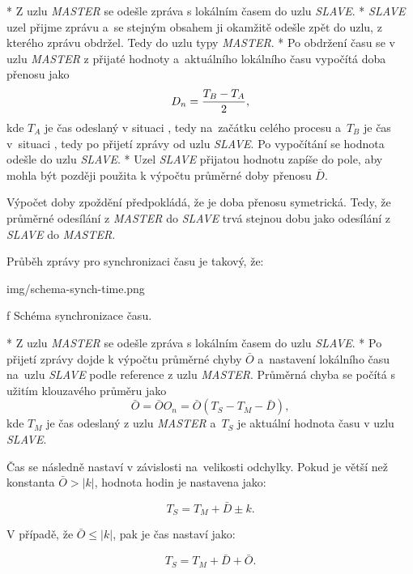 \begitems
* {\sbf [A]} Z uzlu {\em MASTER} se odešle zpráva s lokálním časem do uzlu {\em SLAVE}.
* {\sbf [B]} {\em SLAVE} uzel přijme zprávu a~se stejným obsahem ji okamžitě odešle zpět do uzlu, z kterého zprávu obdržel. Tedy do uzlu typy {\em MASTER}.
* {\sbf [C]} Po obdržení času se v uzlu {\em MASTER} z přijaté hodnoty a~aktuálního lokálního času vypočítá doba přenosu jako
$$
D_n = {{T_B - T_A}\over{2}},
$$
kde $T_A$ je čas odeslaný v situaci {\sbf [A]}, tedy na~začátku celého procesu a~$T_B$ je čas v~situaci {\sbf [C]}, tedy po přijetí zprávy od uzlu {\em SLAVE}. Po vypočítání se hodnota odešle do uzlu {\em SLAVE}.
* {\sbf [D]} Uzel {\em SLAVE} přijatou hodnotu zapíše do pole, aby mohla být později použita k výpočtu průměrné doby přenosu $\bar{D}$.
\enditems

Výpočet doby zpoždění předpokládá, že je doba přenosu symetrická. Tedy, že průměrné odesílání z {\em MASTER} do {\em SLAVE} trvá stejnou dobu jako odesílání z {\em SLAVE} do {\em MASTER}.

Průběh zprávy pro synchronizaci {\sbf času} je takový, že:

\medskip
{}
\picw=16cm \cinspic img/schema-synch-time.png
\caption/f Schéma synchronizace času.
\medskip

\begitems
* {\sbf [A]} Z uzlu {\em MASTER} se odešle zpráva s lokálním časem do uzlu {\em SLAVE}.
* {\sbf [B]} Po přijetí zprávy dojde k výpočtu průměrné chyby $\bar{O}$ a~nastavení lokálního času na~uzlu {\em SLAVE} podle reference z uzlu {\em MASTER}. Průměrná chyba se počítá s užitím klouzavého průměru jako 
$$
\bar{O} = \bar{O} O_n = \bar{O} (T_S - T_M - \bar{D}),
$$
kde $T_M$ je čas odeslaný z uzlu {\em MASTER} a~$T_S$ je aktuální hodnota času v uzlu {\em SLAVE}.

Čas se následně nastaví v závislosti na~velikosti odchylky. Pokud je větší než konstanta $\bar{O} > | k |$, hodnota hodin je nastavena jako:

$$
T_S = T_M + \bar{D} \pm k.
$$

V případě, že $\bar{O} \leq | k |$, pak je čas nastaví jako:

$$
T_S = T_M + \bar{D} + \bar{O}.
$$
\enditems

